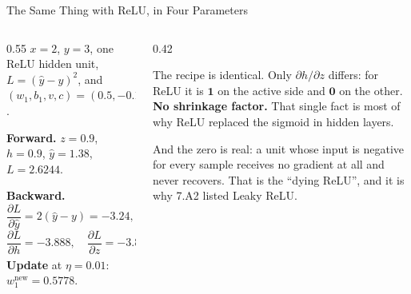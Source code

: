 \begin{frame}{The Same Thing with ReLU, in Four Parameters}
\begin{columns}[T]
\begin{column}{0.55\textwidth}
\small
$x=2$, $y=3$, one ReLU hidden unit, $L=(\hat y-y)^2$, and $(w_1,b_1,v,c)=(0.5,-0.1,1.2,0.3)$.
\medskip

\textbf{Forward.} $z=0.9$, $h=0.9$, $\hat y=1.38$, $L=2.6244$.
\medskip

\textbf{Backward.}
\[
  \frac{\partial L}{\partial\hat y}=2(\hat y-y)=-3.24,\quad
  \frac{\partial L}{\partial v}=-2.916,
\]
\[
  \frac{\partial L}{\partial h}=-3.888,\quad
  \frac{\partial L}{\partial z}=-3.888,\quad
  \frac{\partial L}{\partial w_1}=-7.776 .
\]
\textbf{Update} at $\eta=0.01$: $w_1^{\text{new}}=0.5778$.
\end{column}
\begin{column}{0.42\textwidth}
\begin{conceptbox}[title=\textbf{What changed, and what did not}]\small
The recipe is identical. Only $\partial h/\partial z$ differs: for ReLU it is $\mathbf{1}$ on the active side and $\mathbf{0}$ on the other.
\medskip
\textbf{No shrinkage factor.} That single fact is most of why ReLU replaced the sigmoid in hidden layers.
\end{conceptbox}
\medskip
\begin{examplebox}\footnotesize
And the zero is real: a unit whose input is negative for every sample receives no gradient at all and never recovers. That is the ``dying ReLU'', and it is why 7.A2 listed Leaky ReLU.
\end{examplebox}
\end{column}
\end{columns}
\vspace{1mm}
\end{frame}

